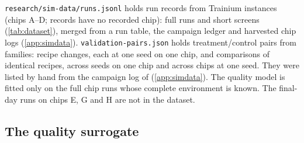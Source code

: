 \texttt{research/sim-data/runs.jsonl} holds  run records from  Trainium instances (chips
A--D;  records have no recorded chip):  full runs and  short screens
(\cref{tab:dataset}), merged from a run table, the campaign ledger and harvested chip logs (\cref{app:simdata}).
\texttt{validation-pairs.json} holds  treatment/control pairs from  families:
 recipe changes, each at one seed on one chip, and  comparisons of identical
recipes,  across seeds on one chip and  across chips at one seed. They
were listed by hand from the campaign log of \docnum{} (\cref{app:simdata}). The quality model is
fitted only on the  full chip runs whose complete environment is known. The final-day runs on chips E, G
and H are not in the dataset.

\subsection{The quality surrogate}
\label{sec:quality}


